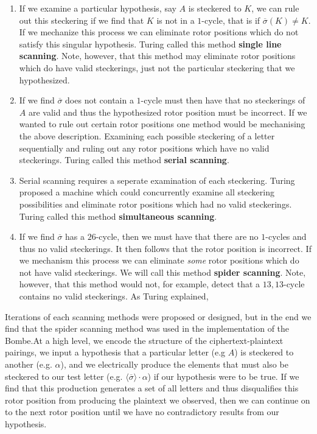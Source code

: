    \begin{enumerate}
        \item If we examine a particular hypothesis, say $A$ is steckered to $K$, we can rule out this steckering if we find that $K$ is not in a $1$-cycle, that is if $\overline\sigma(K) \ne K$. If we
        mechanize this process we can eliminate rotor positions which do not satisfy this singular hypothesis. Turing called this method \textbf{single line scanning}. Note, however, that this method may eliminate rotor
        positions which do have valid steckerings, just not the particular steckering that we hypothesized.
        \item If we find $\overline\sigma$ does not contain a $1$-cycle must then have that no steckerings of $A$ 
        are valid and thus the hypothesized rotor position must be incorrect. If we wanted to rule out certain rotor positions one method would be mechanising the above description. Examining
        each possible steckering of a letter sequentially and ruling out any rotor positions which have no valid steckerings. Turing called this method \textbf{serial scanning}.
        \item Serial scanning requires a seperate examination of each steckering. Turing proposed a machine which could concurrently examine all steckering possibilities and eliminate rotor positions
        which had no valid steckerings. Turing called this method \textbf{simultaneous scanning}.
        \item If we find $\overline\sigma$ has a $26$-cycle, then we must have that there are no $1$-cycles and thus no valid steckerings. It then follows that the rotor position is incorrect.
        If we mechanism this process we can eliminate \emph{some} rotor positions which do not have valid steckerings. We will call this method \textbf{spider scanning}. Note, however, that this method 
        would not, for example, detect that a $13,13$-cycle contains no valid steckerings. As Turing explained, 
    \end{enumerate}
    Iterations of each scanning methods were proposed or designed, but in the end we find that the spider scanning method was used in the implementation of the Bombe.At a high level, we encode the structure of the ciphertext-plaintext pairings, we input a hypothesis that a particular 
    letter (e.g $A$) is steckered to another (e.g. $\alpha$), and we electrically produce the elements that must also be steckered to our test letter 
    (e.g. $\langle\overline{\sigma}\rangle\cdot\alpha$) if our hypothesis were to be true. If we find that this production generates a set of all letters and thus disqualifies this rotor position from producing
    the plaintext we observed, then we can continue on to the next rotor position until we have no contradictory results from our hypothesis.

